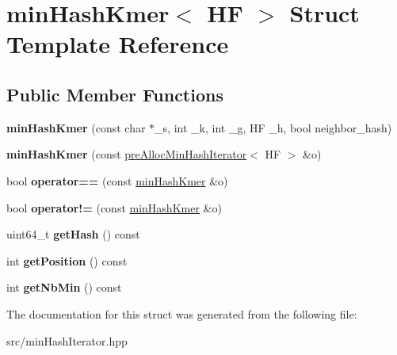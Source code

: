 \hypertarget{structminHashKmer}{}\section{min\+Hash\+Kmer$<$ HF $>$ Struct Template Reference}
\label{structminHashKmer}
\subsection*{Public Member Functions}
\begin{DoxyCompactItemize}
\item 
\mbox{\label{structminHashKmer_afc41dc2b4211d7b9dcdc80b3d306c0a2}} 
{\bfseries min\+Hash\+Kmer} (const char $\ast$\+\_\+s, int \+\_\+k, int \+\_\+g, HF \+\_\+h, bool neighbor\+\_\+hash)
\item 
\mbox{\label{structminHashKmer_a3501c3531da529fd7b5b0946bbd18786}} 
{\bfseries min\+Hash\+Kmer} (const \hyperlink{classpreAllocMinHashIterator}{pre\+Alloc\+Min\+Hash\+Iterator}$<$ HF $>$ \&o)
\item 
\mbox{\label{structminHashKmer_a05eaf71e4f1a471f8801a63ffcb5b013}} 
bool {\bfseries operator==} (const \hyperlink{structminHashKmer}{min\+Hash\+Kmer} \&o)
\item 
\mbox{\label{structminHashKmer_a922e83b466b04b034a25bbb3fdf5e7f2}} 
bool {\bfseries operator!=} (const \hyperlink{structminHashKmer}{min\+Hash\+Kmer} \&o)
\item 
\mbox{\label{structminHashKmer_a8e8076ec83fddc7ecf1694c343f1d79b}} 
uint64\+\_\+t {\bfseries get\+Hash} () const
\item 
\mbox{\label{structminHashKmer_abce735f2005458dce6dac9c84b0d17a3}} 
int {\bfseries get\+Position} () const
\item 
\mbox{\label{structminHashKmer_ad69890c82fdd4f9871ed1a2f1215e958}} 
int {\bfseries get\+Nb\+Min} () const
\end{DoxyCompactItemize}


The documentation for this struct was generated from the following file\+:\begin{DoxyCompactItemize}
\item 
src/min\+Hash\+Iterator.\+hpp\end{DoxyCompactItemize}
